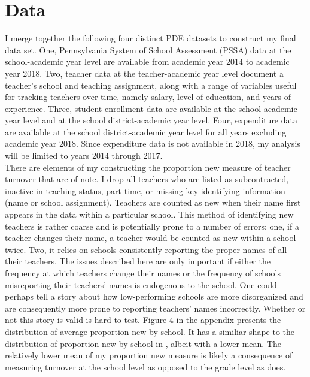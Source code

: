\documentclass[12pt]{report}
\begin{document}
\section{Data}
\normalsize \noindent I merge together the following four distinct PDE datasets to construct my final data set. One, Pennsylvania System of School Assessment (PSSA) data at the school-academic year level are available from academic year 2014 to academic year 2018. Two, teacher data at the teacher-academic year level document a teacher's school and teaching assignment, along with a range of variables useful for tracking teachers over time, namely salary, level of education, and years of experience. Three, student enrollment data are available at the school-academic year level and at the school district-academic year level. Four, expenditure data are available at the school district-academic year level for all years excluding academic year 2018. Since expenditure data is not available in 2018, my analysis will be limited to years 2014 through 2017. \\
\indent There are elements of my constructing the proportion new measure of teacher turnover that are of note. I drop all teachers who are listed as subcontracted, inactive in teaching status, part time, or missing key identifying information (name or school assignment). Teachers are counted as new when their name first appears in the data within a particular school. This method of identifying new teachers is rather coarse and is potentially prone to a number of errors: one, if a teacher changes their name, a teacher would be counted as new within a school twice. Two, it relies on schools consistently reporting the proper names of all their teachers. The issues described here are only important if either the frequency at which teachers change their names or the frequency of schools misreporting their teachers' names is endogenous to the school. One could perhaps tell a story about how low-performing schools are more disorganized and are consequently more prone to reporting teachers' names incorrectly. Whether or not this story is valid is hard to test. Figure 4 in the appendix presents the distribution of average proportion new by school. It has a similiar shape to the distribution of proportion new by school in \cite{ronfeldt}, albeit with a lower mean. The relatively lower mean of my proportion new measure is likely a consequence of measuring turnover at the school level as opposed to the grade level as \cite{ronfeldt} does. 
\\
\end{document}
